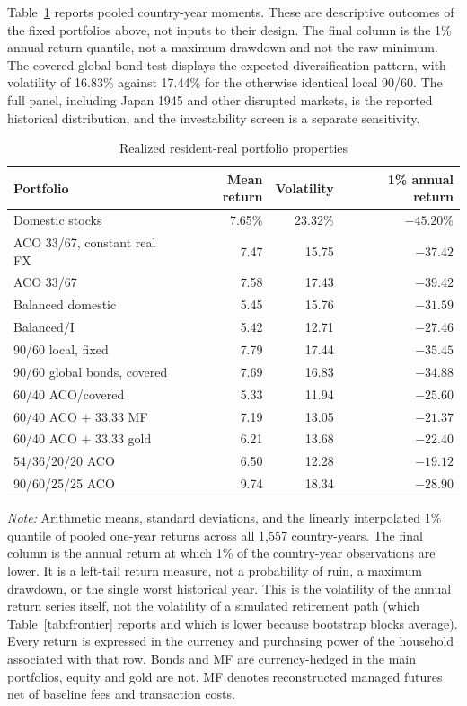 \documentclass[11pt]{article}
\begin{document}
Table~\ref{tab:moments} reports pooled country-year moments. These are
descriptive outcomes of the fixed portfolios above, not inputs to their design.
The final column is the 1\% annual-return quantile, not a maximum drawdown and
not the raw minimum. The covered global-bond test displays the expected diversification
pattern, with volatility of 16.83\% against 17.44\% for the otherwise identical
local 90/60. The full panel, including Japan 1945 and other disrupted markets,
is the reported historical distribution, and the investability screen is a
separate sensitivity.

\begin{table}[t]
\centering
\caption{Realized resident-real portfolio properties}
\label{tab:moments}
\begin{tabular}{lrrr}
\toprule
Portfolio & Mean return & Volatility & 1\% annual return \\
\midrule
Domestic stocks & 7.65\% & 23.32\% & $-45.20\%$ \\
ACO 33/67, constant real FX & 7.47 & 15.75 & $-37.42$ \\
ACO 33/67 & 7.58 & 17.43 & $-39.42$ \\
Balanced domestic & 5.45 & 15.76 & $-31.59$ \\
Balanced/I & 5.42 & 12.71 & $-27.46$ \\
90/60 local, fixed & 7.79 & 17.44 & $-35.45$ \\
90/60 global bonds, covered & 7.69 & 16.83 & $-34.88$ \\
60/40 ACO/covered & 5.33 & 11.94 & $-25.60$ \\
60/40 ACO $+$ 33.33 MF & 7.19 & 13.05 & $-21.37$ \\
60/40 ACO $+$ 33.33 gold & 6.21 & 13.68 & $-22.40$ \\
54/36/20/20 ACO & 6.50 & 12.28 & $-19.12$ \\
90/60/25/25 ACO & 9.74 & 18.34 & $-28.90$ \\
\bottomrule
\end{tabular}
\begin{minipage}{0.94\textwidth}\footnotesize
\textit{Note:} Arithmetic means, standard deviations, and the linearly
interpolated 1\% quantile of pooled one-year returns across all 1,557
country-years. The final column is the annual return at which 1\% of the
country-year observations are lower. It is a left-tail return measure, not a
probability of ruin, a maximum drawdown, or the single worst historical year.
This is the volatility of the annual return series itself, not
the volatility of a simulated retirement path (which Table~\ref{tab:frontier}
reports and which is lower because bootstrap blocks average). Every return is
expressed in the currency and purchasing power of the household associated with
that row. Bonds and MF are currency-hedged in the main portfolios, equity and
gold are not. MF denotes reconstructed managed futures net of baseline fees and
transaction costs.
\end{minipage}
\end{table}
\end{document}
